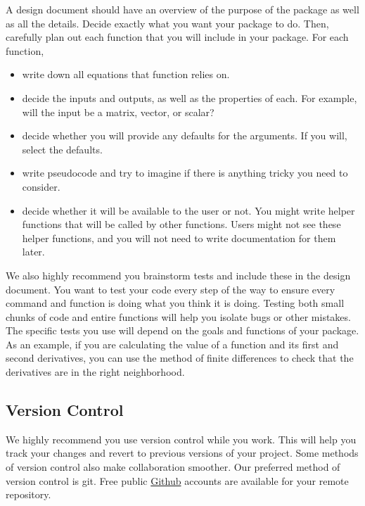 \documentclass{article}
\begin{document}
A design document should have an overview of the purpose of the package as well as all the details. Decide exactly what you want your package to do. Then, carefully plan out each function that you will include in your package. For each function,
\begin{itemize}
\item write down all equations that function relies on.
\item decide the inputs and outputs, as well as the properties of each. For example, will the input be a matrix, vector, or scalar?
\item decide whether you will provide any defaults for the arguments. If you will, select  the defaults.
\item write pseudocode  and try to imagine if there is anything tricky you need to consider. 
\item decide whether it will be available to the user or not. You might write helper functions that will be called by other functions. Users might not see these helper functions, and you will not need to write documentation for them later.
\end{itemize}

We also highly recommend you brainstorm tests and include these in the design document. You want to test your code every step of the way to ensure every command and function is doing what you think it is doing. Testing both small chunks of code and entire functions will help you isolate bugs or other mistakes. The specific tests you use will depend on the goals and functions of your package. As an example, if you are calculating the value of a function and its first and second derivatives, you can use the method of finite differences to check that the derivatives are in the right neighborhood. 


\subsection{Version Control}
We highly recommend you use version control while you work. This will help you track your changes and revert to previous versions of your project. Some methods of version control also make collaboration smoother. Our preferred method of version control is git.  Free public \href{https://github.com}{Github} accounts are available for your remote repository.
\end{document}
